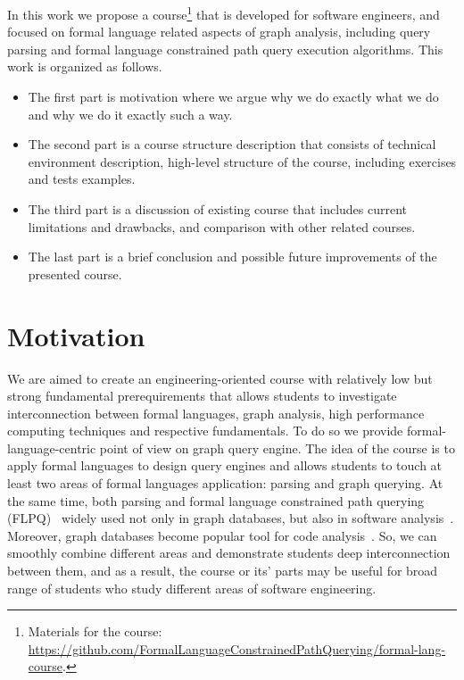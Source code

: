 \documentclass[sigconf]{acmart}
\begin{document}
In this work we propose a course\footnote{Materials for the course: \url{https://github.com/FormalLanguageConstrainedPathQuerying/formal-lang-course}.} that is developed for software engineers, and focused on formal language related aspects of graph analysis, including query parsing and formal language constrained path query execution algorithms.
This work is organized as follows.
\begin{itemize}
  \item The first part is motivation where we argue why we do exactly what we do and why we do it exactly such a way. 
  \item The second part is a course structure description that consists of technical environment description, high-level structure of the course, including exercises and tests examples.
  \item The third part is a discussion of existing course that includes current limitations and drawbacks, and comparison with other related courses.
  \item The last part is a brief conclusion and possible future improvements of the presented course.
\end{itemize}  

\section{Motivation}

We are aimed to create an engineering-oriented course with relatively low but strong fundamental prerequirements that allows students to investigate interconnection between formal languages, graph analysis, high performance computing techniques and respective fundamentals.
To do so we provide formal-language-centric point of view on graph query engine.
The idea of the course is to apply formal languages to design query engines and allows students to touch at least two areas of formal languages application: parsing and graph querying.
At the same time, both parsing and formal language constrained path querying (FLPQ)~\cite{10.1137/S0097539798337716} widely used not only in graph databases, but also in software analysis~\cite{10.1145/3583660.3583664}.
Moreover, graph databases become popular tool for code analysis~\cite{URMA2015127}.
So, we can smoothly combine different areas and demonstrate students deep interconnection between them, and as a result, the course or its' parts may be useful for broad range of students who study different areas of software engineering.
\end{document}
